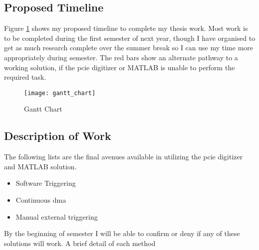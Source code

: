 \subsection{Proposed Timeline}
Figure \ref{fig::gantt_chart} shows my proposed timeline to complete my thesis work. Most work is to be completed during the first semester of next year, though I have organised to get as much research complete over the summer break so I can use my time more appropriately during semester. The red bars show an alternate pathway to a working solution, if the \gls{pcie} digitizer or MATLAB is unable to perform the required task.
\begin{figure}[htbp!]
	\centering
	\texttt{[image: gantt\_chart]}
	\caption{Gantt Chart}
	\label{fig::gantt_chart}
\end{figure}

\subsection{Description of Work}

The following lists are the final avenues available in utilizing the \gls{pcie} digitizer and MATLAB solution.
\begin{itemize}
	\item Software Triggering
	\item Continuous \gls{dma}
	\item Manual external triggering
\end{itemize}
By the beginning of semester I will be able to confirm or deny if any of these solutions will work. A brief detail of each method


